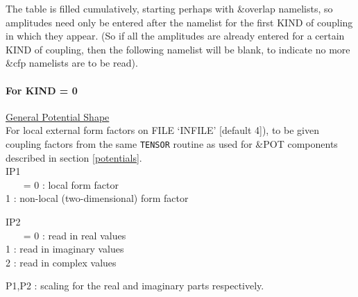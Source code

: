 \documentclass[11pt]{article}
\begin{document}
\begin{description}
The table is filled cumulatively,
starting perhaps with \&overlap namelists, 
so amplitudes need only be
entered after the namelist for the first KIND of coupling in which
they appear.
(So if all the amplitudes are already entered for a certain KIND
of coupling, then the following namelist will be blank, to indicate
no more \&cfp namelists are to be read).

\paragraph{For KIND = 0} 
\underline{General Potential Shape}\\
For local external form factors on FILE `INFILE' [default 4]), to be given 
coupling factors from the same {\tt TENSOR} routine as used for \&POT components
described in section \ref{potentials}.\\

IP1\\
~~~  = 0 : local form factor
\\   1 : non-local (two-dimensional) form factor


IP2\\
~~~  = 0 : read in real values      
\\   1 : read in imaginary values   
\\   2 : read in complex values  


 P1,P2 : scaling for the real and imaginary parts respectively.\\


\end{description}
\end{document}
